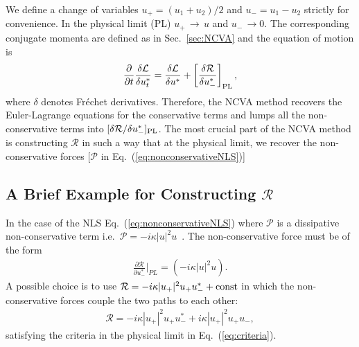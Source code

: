 We define a change of variables $u_{+} = (u_1 + u_2)/2$ and $u_{-} = u_1 - u_2$ strictly for convenience.  In the physical limit (PL) $u_+ \, \rightarrow \, u$ and $u_- \, \rightarrow 0$.     The corresponding conjugate momenta are defined as in Sec.~\ref{sec:NCVA} and the equation of motion is
%
\begin{equation}
\frac{\partial }{\partial t} \frac{\delta \mathcal{L}}{\delta u_t^*}=  \frac{\delta \mathcal{L}}{\delta u^*} + \left[ \frac{\delta \mathcal{R}}{\delta u_-^* }\right]_{\rm PL},
\end{equation}
%
where $\delta$ denotes Fr\'{e}chet derivatives.  Therefore, the NCVA method recovers the Euler-Lagrange equations for the conservative terms and lumps all the non-conservative terms into $[ \delta \mathcal{R}/\delta u_-^* ]_{\rm PL}$.  The most crucial part of the NCVA method is constructing $\mathcal{R}$ in such a way that at the physical limit, we recover the non-conservative forces [$\mathcal{P}$ in Eq.~(\ref{eq:nonconservativeNLS})]

\subsection{A Brief Example for Constructing $\mathcal{R}$}
In the case of the NLS Eq.~(\ref{eq:nonconservativeNLS})
where $\mathcal{P}$ is a dissipative non-conservative term i.e.~$\mathcal{P} = -i\kappa |u|^2u$~\cite{Cerda}.  The non-conservative force must be of the form  
\begin{align}
\frac{\partial \mathcal{R}}{\partial u_-^*}\Bigg|_{PL}  = (-i\kappa |u|^2u ).
\label{eq:criteria}
\end{align} 
A possible choice is to use $\mathcal{R} = -i\kappa |u_+|^2u_+u_-^* + {\rm const}$ in which the non-conservative forces couple the two paths to each other:
\begin{align}
\mathcal{R} = - i\kappa |u_+|^2u_+u_-^* + i\kappa |u_+|^2u_+u_-,
\end{align}
satisfying the criteria in the physical limit in Eq.~(\ref{eq:criteria}).  

